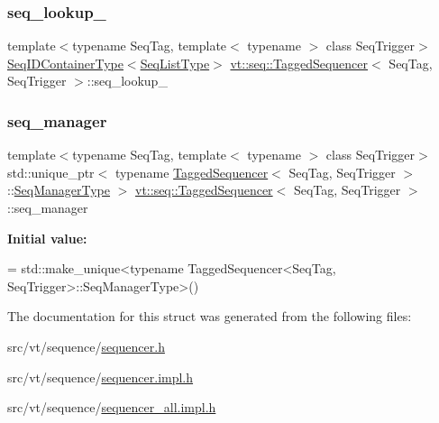 \subsubsection{\texorpdfstring{seq\+\_\+lookup\+\_\+}{seq\_lookup\_}}
{\footnotesize\ttfamily template$<$typename Seq\+Tag, template$<$ typename $>$ class Seq\+Trigger$>$ \\
\hyperlink{structvt_1_1seq_1_1_tagged_sequencer_a718515267468123a9036c30033d74237}{Seq\+I\+D\+Container\+Type}$<$\hyperlink{structvt_1_1seq_1_1_tagged_sequencer_a8df6e02cdb7c2b38870f7ee7776f6f9c}{Seq\+List\+Type}$>$ \hyperlink{structvt_1_1seq_1_1_tagged_sequencer}{vt\+::seq\+::\+Tagged\+Sequencer}$<$ Seq\+Tag, Seq\+Trigger $>$\+::seq\+\_\+lookup\+\_\+\hspace{0.3cm}{\ttfamily [private]}}

\mbox{\label{structvt_1_1seq_1_1_tagged_sequencer_a2c5fd9d4885dc33df2ee11111f9b76be}} 
\subsubsection{\texorpdfstring{seq\+\_\+manager}{seq\_manager}}
{\footnotesize\ttfamily template$<$typename Seq\+Tag, template$<$ typename $>$ class Seq\+Trigger$>$ \\
std\+::unique\+\_\+ptr$<$ typename \hyperlink{structvt_1_1seq_1_1_tagged_sequencer}{Tagged\+Sequencer}$<$ Seq\+Tag, Seq\+Trigger $>$\+::\hyperlink{structvt_1_1seq_1_1_tagged_sequencer_a892e0a759dc975bf74e35f9ebf7a2967}{Seq\+Manager\+Type} $>$ \hyperlink{structvt_1_1seq_1_1_tagged_sequencer}{vt\+::seq\+::\+Tagged\+Sequencer}$<$ Seq\+Tag, Seq\+Trigger $>$\+::seq\+\_\+manager\hspace{0.3cm}{\ttfamily [static]}}

{\bfseries Initial value\+:}
\begin{DoxyCode}
=
    std::make\_unique<typename TaggedSequencer<SeqTag, SeqTrigger>::SeqManagerType>()
\end{DoxyCode}


The documentation for this struct was generated from the following files\+:\begin{DoxyCompactItemize}
\item 
src/vt/sequence/\hyperlink{sequencer_8h}{sequencer.\+h}\item 
src/vt/sequence/\hyperlink{sequencer_8impl_8h}{sequencer.\+impl.\+h}\item 
src/vt/sequence/\hyperlink{sequencer__all_8impl_8h}{sequencer\+\_\+all.\+impl.\+h}\end{DoxyCompactItemize}
